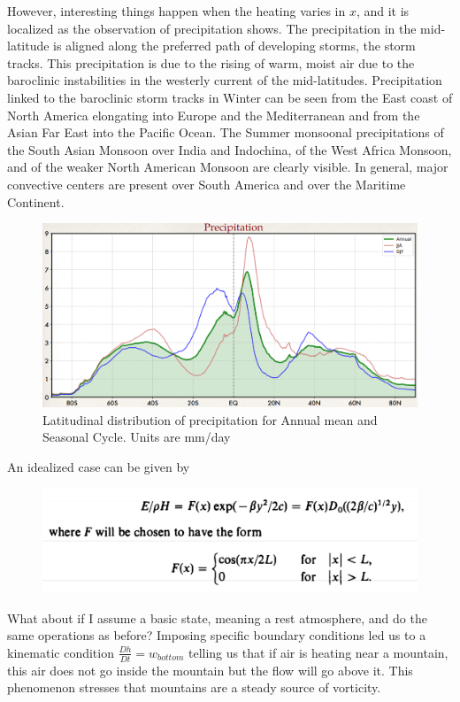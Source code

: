 However, interesting things happen when the heating varies in $x$, and it is localized as the observation of precipitation shows. The precipitation in the mid-latitude is aligned along the preferred path of developing storms, the storm tracks. This precipitation is due to the rising of warm, moist air due to the baroclinic instabilities in the westerly current of the mid-latitudes. Precipitation linked to the baroclinic storm tracks in Winter can be seen from the East coast of North America elongating into Europe and the Mediterranean and from the Asian Far East into the Pacific Ocean. The Summer monsoonal precipitations of the South Asian Monsoon over India and Indochina, of the West Africa Monsoon, and of the weaker North American Monsoon are clearly visible. In general, major convective centers are present over South America and over the Maritime Continent.
\begin{figure}[htpb]
    \centering
    \includegraphics[width=0.45\linewidth]{uploads/precipit.png}
    \caption{Latitudinal distribution of precipitation for Annual
mean and Seasonal Cycle. Units are mm/day}
    \label{fig:precipitation}
\end{figure}


An idealized case can be given by
\begin{figure}[htpb]
    \centering
    \includegraphics[width=0.5\linewidth]{uploads/22image.png}
\end{figure}

What about if I assume a basic state, meaning a rest atmosphere, and do the same operations as before? Imposing specific boundary conditions led us to a kinematic condition $\frac{Dh}{Dt}=w_{bottom}$ telling us that if air is heating near a mountain, this air does not go inside the mountain but the flow will go above it. This phenomenon stresses that mountains are a steady source of vorticity. 


